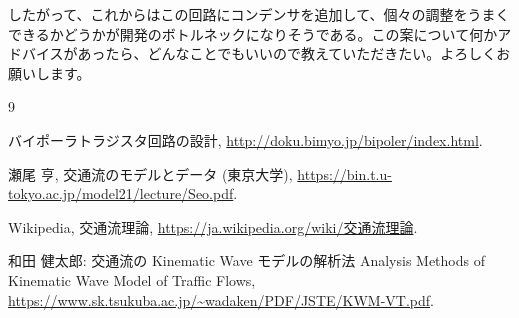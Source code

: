 \documentclass[11pt,a4paper,twocolumn]{jsarticle}
\begin{document}
したがって、これからはこの回路にコンデンサを追加して、個々の調整をうまくできるかどうかが開発のボトルネックになりそうである。この案について何かアドバイスがあったら、どんなことでもいいので教えていただきたい。よろしくお願いします。

\begin{thebibliography}{9}

バイポーラトラジスタ回路の設計,
\url{http://doku.bimyo.jp/bipoler/index.html}.

瀬尾 亨,
交通流のモデルとデータ (東京大学),
\url{https://bin.t.u-tokyo.ac.jp/model21/lecture/Seo.pdf}.

Wikipedia,
交通流理論,
\url{https://ja.wikipedia.org/wiki/交通流理論}.

和田 健太郎:
交通流の Kinematic Wave モデルの解析法
Analysis Methods of Kinematic Wave Model of Traffic Flows,
\url{https://www.sk.tsukuba.ac.jp/~wadaken/PDF/JSTE/KWM-VT.pdf}.

\end{thebibliography}
\end{document}
